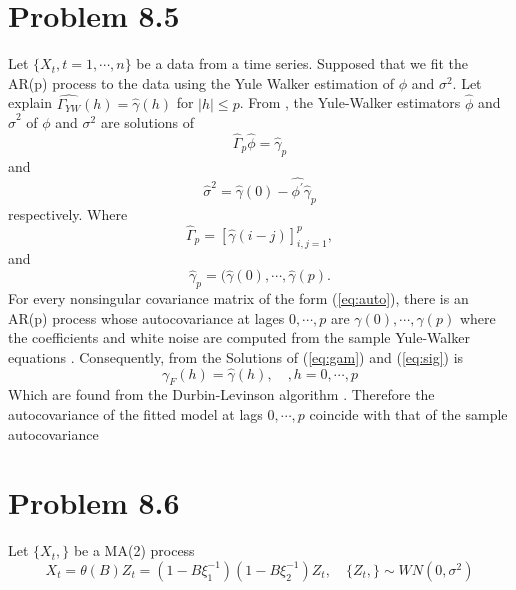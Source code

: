 \documentclass[11pt, oneside]{article}   	%
\begin{document}
\section{Problem 8.5}
Let $\{ X_{t}, t = 1, \cdots, n \}$ be a data from a time series. Supposed that we fit the AR(p) process to the data using the Yule Walker estimation of $\phi$ and $\sigma^{2}$.
Let explain $\hat{\Gamma_{YW}}(h) = \hat{\gamma}(h)$ for $|h|\leq p$.
\justify
 From \cite{petter}, the Yule-Walker estimators $\hat{\phi}$ and $\hat{\sigma}^{2}$ of $\phi$ and $\sigma^{2}$ are solutions of
\clearpage
\begin{equation}\label{eq:gam}
\hat{\Gamma}_{p}\hat{\phi} = \hat{\gamma}_{p}
\end{equation}
and
\begin{equation}\label{eq:sig}
\hat{\sigma}^{2} = \hat{\gamma}(0)- \hat{\phi^{\prime}}\hat{\gamma}_{p}
\end{equation}
respectively. Where
\begin{equation}\label{eq:auto}
\hat{\Gamma}_{p} = [\hat{\gamma}(i-j)]_{i,j=1}^{p},
\end{equation}
and
\begin{equation}
\hat{\gamma}_{p} = (\hat{\gamma}(0), \cdots , \hat{\gamma}(p).
\end{equation}
For every nonsingular covariance matrix of the form (\ref{eq:auto}), there is an AR(p) process whose autocovariance at lages $0, \cdots, p$ are $\gamma(0),\cdots,\gamma(p)$ where the coefficients and white noise are computed from the sample Yule-Walker equations \cite{petter}. Consequently, from \cite{petter} the Solutions of (\ref{eq:gam}) and (\ref{eq:sig}) is 
\begin{equation}
\gamma_{F}(h) = \hat{\gamma}(h), \quad, h=0,\cdots, p
\end{equation}
Which are found from the Durbin-Levinson algorithm \cite{petter}. Therefore the autocovariance of the fitted model at lags $0, \cdots, p$ coincide with that of the sample autocovariance \cite{petter} 



\section{Problem 8.6}
Let $\{ X_{t}, \}$ be a MA(2) process
\begin{equation}
X_{t} = \theta(B)Z_{t} = (1-B\xi_{1}^{-1})(1-B\xi_{2}^{-1})Z_{t}, \quad \{ Z_{t}, \} \sim WN(0, \sigma^{2})
\end{equation}
\end{document}
